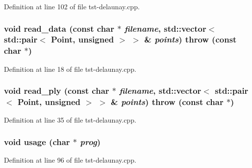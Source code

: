 Definition at line 102 of file tst-\/delaunay.cpp.

\hypertarget{tst-delaunay_8cpp_a46e50ae2d9d8049dd03c290d2cf89cc7}{
\subsubsection[{read\_\-data}]{\setlength{\rightskip}{0pt plus 5cm}void read\_\-data (const char $\ast$ {\em filename}, \/  std::vector$<$ std::pair$<$ {\bf Point}, unsigned $>$ $>$ \& {\em points})  throw (const char $\ast$)}}
\label{tst-delaunay_8cpp_a46e50ae2d9d8049dd03c290d2cf89cc7}


Definition at line 18 of file tst-\/delaunay.cpp.

\hypertarget{tst-delaunay_8cpp_aaa57925527b5ce7c4bb1d6d94b943c85}{
\subsubsection[{read\_\-ply}]{\setlength{\rightskip}{0pt plus 5cm}void read\_\-ply (const char $\ast$ {\em filename}, \/  std::vector$<$ std::pair$<$ {\bf Point}, unsigned $>$ $>$ \& {\em points})  throw (const char $\ast$)}}
\label{tst-delaunay_8cpp_aaa57925527b5ce7c4bb1d6d94b943c85}


Definition at line 35 of file tst-\/delaunay.cpp.

\hypertarget{tst-delaunay_8cpp_aa4817482b1728bf62acf8030cab9842c}{
\subsubsection[{usage}]{\setlength{\rightskip}{0pt plus 5cm}void usage (char $\ast$ {\em prog})}}
\label{tst-delaunay_8cpp_aa4817482b1728bf62acf8030cab9842c}


Definition at line 96 of file tst-\/delaunay.cpp.

